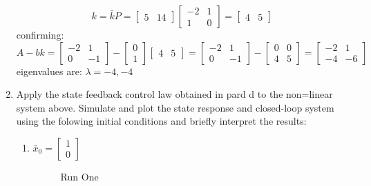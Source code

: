 \begin{enumerate}
\begin{equation}
    \end{equation}
    \begin{equation}
      k = \bar k P =
      \begin{bmatrix}5 & 14\end{bmatrix}
      \begin{bmatrix}
        -2 & 1 \\
        1 & 0
      \end{bmatrix} = 
      \begin{bmatrix}4 & 5\end{bmatrix}
    \end{equation}
    confirming:
    \begin{equation}
      A - bk =
      \begin{bmatrix}
        -2 & 1 \\
        0 & -1
      \end{bmatrix} - 
      \begin{bmatrix}
        0 \\
        1
      \end{bmatrix}
      \begin{bmatrix}4 & 5\end{bmatrix} =
      \begin{bmatrix}
        -2 & 1 \\
        0 & -1
      \end{bmatrix} - 
      \begin{bmatrix}
        0 & 0 \\
        4 & 5
      \end{bmatrix} = 
      \begin{bmatrix}
        -2 & 1 \\
        -4 & -6
      \end{bmatrix}
    \end{equation}
    eigenvalues are: $\lambda = -4, -4$
  \item Apply the state feedback control law obtained in pard d to the non=linear system above.
    Simulate and plot the state response and closed-loop system using the folowing initial conditions and
    briefly
    interpret the results:
    \begin{enumerate}
    \item $\bar x_0 = \begin{bmatrix} 1 \\ 0\end{bmatrix}$ \\
      \begin{figure}[H]
  \begin{center}
  \end{center}
  \caption{Run One}
  \label{fig:run_one}
\end{figure}


\end{enumerate}
\end{enumerate}
